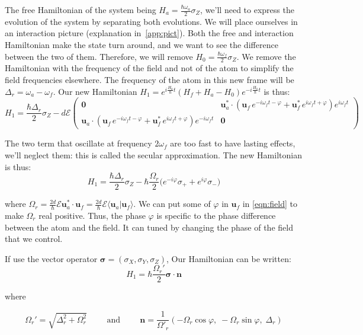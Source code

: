 \documentclass[10pt]{report}
\theoremstyle{plain}
\theoremstyle{definition}
\theoremstyle{remark}
\newcommand{\braket}[2]{\langle#1|#2\rangle}
\newcommand{\mat}[1]{\begin{pmatrix}#1\end{pmatrix}}
\newcommand{\bs}{\boldsymbol}
\begin{document}
The free Hamiltonian of the system being $H_a = \frac{\hbar \omega_a}2 \sigma_Z$,
we'll need to express the evolution of the system by separating both evolutions.
We will place ourselves in an interaction picture (explanation
in~\cref{app:pict}). Both the free and interaction Hamiltonian make the state turn
around, and we want to see the difference between the two of them. Therefore, we
will remove $H_0 = \frac{\hbar \omega_f}2 \sigma_Z$. We remove the Hamiltonian
with the frequency of the field and not of the atom to simplify the field
frequencies elsewhere. The frequency of the atom in this new frame will be
$\Delta_r = \omega_a - \omega_f$.
Our new Hamiltonian $H_1 = e^{i\frac{H_0}\hbar t}(H_f + H_a - H_0)e^{-i\frac{H_0}\hbar t}$ is thus:
\[H_1 = \frac{\hbar \Delta_r}2 \sigma_Z -
  d\mathcal{E} \mat{\bs 0 &
    \bs u_a^* \cdot (\bs u_f\, e^{-i\omega_f t-\varphi} + \bs u_f^*\,
    e^{i\omega_f t + \varphi}) e^{i\omega_f t}\\
    \bs u_a \cdot (\bs u_f\, e^{-i\omega_f t-\varphi} + \bs u_f^*\,
    e^{i\omega_f t + \varphi}) e^{-i\omega_f t} & \bs 0
  }\]

The two term that oscillate at frequency $2\omega_f$ are too fast to have
lasting effects, we'll neglect them: this is called the secular approximation.
The new Hamiltonian is thus:
\begin{equation}\label{eqn:RamseyH}
H_1 = \frac{\hbar \Delta_r}2 \sigma_Z -\hbar \frac{\Omega_r}2
  \big(e^{-i\varphi}\sigma_+ + e^{i\varphi}\sigma_-\big)
\end{equation}

where $\Omega_r=\frac{2d}{\hbar}\mathcal{E}\bs u_a^* \cdot \bs u_f = \frac{2d}{\hbar}\mathcal{E}\braket{\bs u_a}{\bs u_f}$. We can put
some of $\varphi$ in $\bs u_f$ in \cref{eqn:field} to make $\Omega_r$ real
positive. Thus, the phase $\varphi$ is specific to the phase difference between the atom
and the field. It can tuned by changing the phase of the field that we control.

If use the vector operator $\bs \sigma = (\sigma_X,\sigma_Y,\sigma_Z)$, Our
Hamiltonian can be written:
\begin{equation}
H_1 = \hbar \frac{\Omega_r'}2 \bs \sigma \cdot \bs n
\end{equation}

where

\[ \Omega_r' = \sqrt{\Delta_r^2 + \Omega_r^2} \hspace {1cm}
  \text{and}\hspace{1cm} \bs n = \frac 1 {\Omega'_r}(-\Omega_r \cos \varphi,\;
  -\Omega_r \sin \varphi,\; \Delta_r)\]
\end{document}
